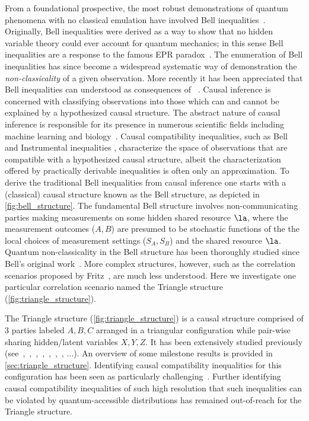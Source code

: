 \documentclass[aps, 10pt, english, twoside, pra, nofootinbib, tightenlines, longbibliography, superscriptaddress]{revtex4-1}
\begin{document}
    From a foundational prospective, the most robust demonstrations of quantum phenomena with no classical emulation have involved Bell inequalities~\cite{Bell_1964,Brunner_2013}. Originally, Bell inequalities were derived as a way to show that no hidden variable theory could ever account for quantum mechanics; in this sense Bell inequalities are a response to the famous EPR paradox~\cite{EPR_Orig}. The enumeration of Bell inequalities has since become a widespread systematic way of demonstration the \textit{non-classicality} of a given observation. More recently it has been appreciated that Bell inequalities can understood as consequences of ~\cite{Wood_2012}. Causal inference is concerned with classifying observations into those which can and cannot be explained by a hypothesized causal structure. The abstract nature of causal inference is responsible for its presence in numerous scientific fields including machine learning and biology~\cite{Pearl_2009,Pearl_2009_tr}. Causal compatibility inequalities, such as Bell and Instrumental inequalities \cite{pearl1995instrumental,bonet2001instrumental,evans2012graphical}, characterize the space of observations that are compatible with a hypothesized causal structure, albeit the characterization offered by practically derivable inequalities is often only an approximation. To derive the traditional Bell inequalities from causal inference one starts with a (classical) causal structure known as the Bell structure, as depicted in \cref{fig:bell_structure}. The fundamental Bell structure involves non-communicating parties making measurements on some hidden shared resource $\la$, where the measurement outcomes ($A, B$) are presumed to be stochastic functions of the the local choices of measurement settings ($S_A, S_B$) and the shared resource $\la$. Quantum non-classicality in the Bell structure has been thoroughly studied since Bell's original work~\cite{Brunner_2013}. More complex structures, however, such as the correlation scenarios proposed by Fritz~\cite{Fritz_2012,Fritz_2014}, are much less understood. Here we investigate one particular correlation scenario named the Triangle structure (\cref{fig:triangle_structure}).

    The Triangle structure (\cref{fig:triangle_structure}) is a causal structure comprised of $3$ parties labeled $A, B, C$ arranged in a triangular configuration while pair-wise sharing hidden/latent variables $X, Y, Z$. It has been extensively studied previously (see~\cite[Fig. 1]{Steudel_2010},~\cite[Fig. 6]{Chaves_2014},~\cite[Fig. 8]{Branciard_2012},~\cite[Fig. 8, App. E]{Henson_2014},~\cite[Fig. 3]{Fritz_2012},~\cite[Fig. 4]{Weilenmann_2016},~\cite[Fig. 1]{Inflation}, $\ldots$). An overview of some milestone results is provided in \cref{sec:triangle_structure}. Identifying causal compatibility inequalities for this configuration has been seen as particularly challenging~\cite{Branciard_2012}. Further identifying causal compatibility inequalities of such high resolution that such inequalities can be violated by quantum-accessible distributions has remained out-of-reach for the Triangle structure.
\end{document}
